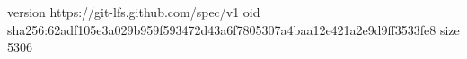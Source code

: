 version https://git-lfs.github.com/spec/v1
oid sha256:62adf105e3a029b959f593472d43a6f7805307a4baa12e421a2e9d9ff3533fe8
size 5306
